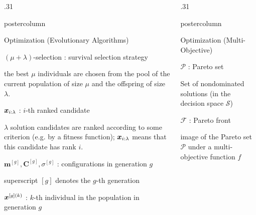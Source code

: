 \documentclass[11pt,compress,t,notes=noshow, xcolor=table]{beamer}
\newlength{\columnheight} %
\begin{document}
\begin{frame}[fragile]{}
\begin{columns}
\begin{column}{.31\textwidth}
\begin{beamercolorbox}[center]{postercolumn}
\begin{minipage}{.98\textwidth}
{\begin{myblock}{Optimization (Evolutionary Algorithms)}
						\begin{codebox}
							 $(\mu + \lambda)$-selection : survival selection strategy
						\end{codebox}
						\hspace*{1ex} the best $\mu$ individuals are chosen from the pool of the current population of size $\mu$ and the offspring of size $\lambda$. \\
						\begin{codebox}
							 $\bm{x}_{i:\lambda}$ : $i$-th ranked candidate
						\end{codebox}
						\hspace*{1ex} $\lambda$ solution candidates are ranked according to some criterion (e.g. by a fitness function); $\bm{x}_{i:\lambda}$ means that this candidate has rank $i$. \\
						\begin{codebox}
							 $\bm{m}^{[g]}, \bm{C}^{[g]}, \sigma^{[g]}$ : configurations in generation $g$
						\end{codebox}
						\hspace*{1ex} superscript $[g]$ denotes the $g$-th generation \\
						\begin{codebox}
							 $\bm{x}^{[g](k)}$ : $k$-th individual in the population in generation $g$
						\end{codebox}
						\end{myblock}
				}
			\end{minipage}
		\end{beamercolorbox}
	\end{column}
    \begin{column}{.31\textwidth}
	       	\begin{beamercolorbox}[center]{postercolumn}
			     \begin{minipage}{.98\textwidth}
				    \parbox[t][\columnheight]{\textwidth}{
                        \begin{myblock}{Optimization (Multi-Objective)}
    						\begin{codebox}
    						      $\mathcal{P}$ : Pareto set
    						\end{codebox}
    						\hspace*{1ex} Set of nondominated solutions (in the decision space $\mathcal{S}$) \\
    						\begin{codebox}
    						      $\mathcal{F}$ : Pareto front
    						\end{codebox}
    						\hspace*{1ex} image of the Pareto set $\mathcal{P}$ under a multi-objective function $f$ \\
                        \end{myblock}
                    }
			\end{minipage}
		\end{beamercolorbox}
	\end{column}
\end{columns}
\end{frame}
\end{document}
